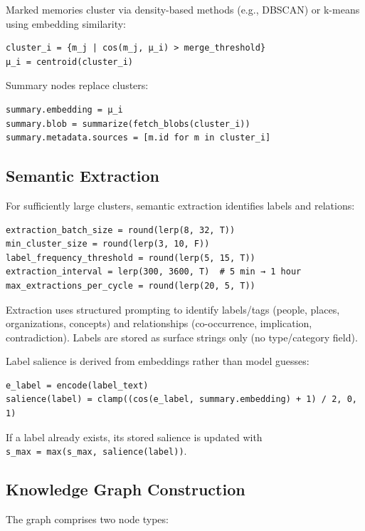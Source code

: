 \documentclass[
  letterpaper,
  DIV=11,
  numbers=noendperiod]{scrartcl}
\begin{document}
Marked memories cluster via density-based methods (e.g., DBSCAN) or
k-means using embedding similarity:

\begin{verbatim}
cluster_i = {m_j | cos(m_j, μ_i) > merge_threshold}
μ_i = centroid(cluster_i)
\end{verbatim}

Summary nodes replace clusters:

\begin{verbatim}
summary.embedding = μ_i
summary.blob = summarize(fetch_blobs(cluster_i))
summary.metadata.sources = [m.id for m in cluster_i]
\end{verbatim}

\subsection{Semantic Extraction}\label{semantic-extraction}

For sufficiently large clusters, semantic extraction identifies labels
and relations:

\begin{verbatim}
extraction_batch_size = round(lerp(8, 32, T))
min_cluster_size = round(lerp(3, 10, F))
label_frequency_threshold = round(lerp(5, 15, T))
extraction_interval = lerp(300, 3600, T)  # 5 min → 1 hour
max_extractions_per_cycle = round(lerp(20, 5, T))
\end{verbatim}

Extraction uses structured prompting to identify labels/tags (people,
places, organizations, concepts) and relationships (co-occurrence,
implication, contradiction). Labels are stored as surface strings only
(no type/category field).

Label salience is derived from embeddings rather than model guesses:

\begin{verbatim}
e_label = encode(label_text)
salience(label) = clamp((cos(e_label, summary.embedding) + 1) / 2, 0, 1)
\end{verbatim}

If a label already exists, its stored salience is updated with
\texttt{s\_max\ =\ max(s\_max,\ salience(label))}.

\subsection{Knowledge Graph
Construction}\label{knowledge-graph-construction}

The graph comprises two node types:
\end{document}
